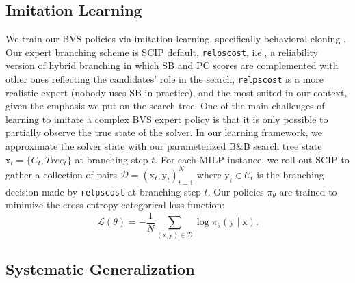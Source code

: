 \documentclass[letterpaper]{article} %
\begin{document}
\subsection{Imitation Learning}
\label{subsec:imitationlearning}

We train our BVS policies via imitation learning, specifically behavioral cloning \cite{BehavioralCloning}.
Our expert branching scheme is SCIP default, \texttt{relpscost}, i.e., a reliability version of hybrid branching in which SB and PC scores are complemented with other ones reflecting the candidates' role in the search; \texttt{relpscost} is a more realistic expert (nobody uses SB in practice), and the most suited in our context, given the emphasis we put on the search tree.
One of the main challenges of learning to imitate a complex BVS expert policy is that it is only possible to partially observe the true state of the solver.
In our learning framework, we approximate the solver state with our parameterized B\&B search tree state $\mathrm{x}_t = \{C_t, \mathit{Tree}_t\}$ at branching step $t$.
For each MILP instance, we roll-out SCIP to gather a collection of pairs $\mathcal{D} = (\mathrm{x}_t, \mathrm{y}_t)_{t=1}^N$ where $\mathrm{y}_t \in\mathcal{C}_t$ is the branching decision made by \texttt{relpscost} at branching step $t$.
Our policies $\pi_{\theta}$ are trained to minimize the cross-entropy categorical loss function:
\begin{equation}\label{eq:il-objective}
   \mathcal{L}(\theta) = -\frac{1}{N}\sum_{ (\mathrm{x}, \mathrm{y}) \in \mathcal{D}} \log \pi_{\theta}(\mathrm{y} \mid \mathrm{x}).
\end{equation}

\subsection{Systematic Generalization}
\label{subsec:systematicgen}
\end{document}
